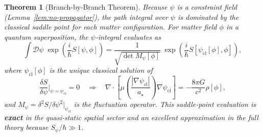 \documentclass[11pt,a4paper]{article}
\newtheorem{theorem}{Theorem}[section]
\begin{document}
\begin{theorem}[Branch-by-Branch Theorem]
\label{thm:branch-by-branch}
Because $\psi$ is a constraint field (Lemma~\ref{lem:no-propagator}), the
path integral over $\psi$ is dominated by the classical saddle point for
each matter configuration. For matter field $\phi$ in a quantum
superposition, the $\psi$-integral evaluates as
\begin{equation}\label{eq:saddle}
\int\mathcal{D}\psi\;\exp\!\left(\frac{i}{\hbar}S[\psi,\phi]\right)
= \frac{1}{\sqrt{\det M_\psi[\phi]}}\;
\exp\!\left(\frac{i}{\hbar}S[\psi_\mathrm{cl}[\phi],\phi]\right),
\end{equation}
where $\psi_\mathrm{cl}[\phi]$ is the unique classical solution of
\begin{equation}\label{eq:constraint-eq}
\frac{\delta S}{\delta\psi}\bigg|_{\psi=\psi_\mathrm{cl}} = 0
\quad\Longrightarrow\quad
\nabla\cdot\!\left[\mu\!\left(\frac{|\nabla\psi_\mathrm{cl}|}{a_\star}\right)
\nabla\psi_\mathrm{cl}\right]
= -\frac{8\pi G}{c^2}\rho[\phi],
\end{equation}
and $M_\psi = \delta^2 S/\delta\psi^2|_{\psi_\mathrm{cl}}$ is the
fluctuation operator. This saddle-point evaluation is \textbf{exact} in
the quasi-static spatial sector and an excellent approximation in the
full theory because $S_\psi/\hbar \gg 1$.
\end{theorem}
\end{document}
